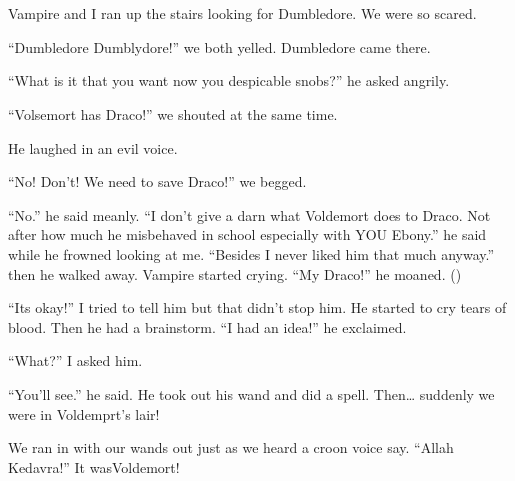 \section{}


\XXX{\Xfill 666\Xfill}

Vampire and I ran up the stairs looking for Dumbledore. We were so scared.

\begin{sloppypar}
    \enquote{Dumbledore Dumblydore!} we both yelled. Dumbledore came there.
\end{sloppypar}

\enquote{What is it that you want now you despicable snobs?} he asked angrily.

\enquote{Volsemort has Draco!} we shouted at the same time.

He laughed in an evil voice.

\enquote{No! Don't! We need to save Draco!} we begged.

\enquote{No.} he said meanly. \enquote{I don't give a darn what Voldemort does to Draco. Not after how much he misbehaved in school especially with YOU Ebony.} he said while he frowned looking at me. \enquote{Besides I never liked him that much anyway.} then he walked away. Vampire started crying. \enquote{My Draco!} he moaned. ()

\enquote{Its okay!} I tried to tell him but that didn't stop him. He started to cry tears of blood. Then he had a brainstorm. \enquote{I had an idea!} he exclaimed.

\enquote{What?} I asked him.

\enquote{You'll see.} he said. He took out his wand and did a spell. Then\ldots{} suddenly we were in Voldemprt's lair!

We ran in with our wands out just as we heard a croon voice say. \enquote{Allah Kedavra!}
It was\dotfill Voldemort!
